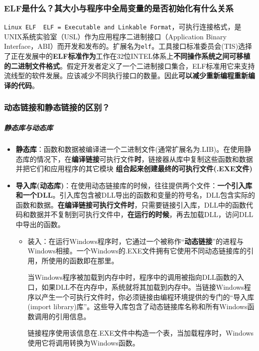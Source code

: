\documentclass[UTF8,a4paper,8pt]{ctexart}
\begin{document}
			
		\subsubsection{ELF是什么？其大小与程序中全局变量的是否初始化有什么关系}
			\verb|Linux ELF  ELF = Executable and Linkable Format|，可执行连接格式，是UNIX系统实验室（USL）作为应用程序二进制接口（Application Binary Interface，ABI）而开发和发布的。扩展名为\verb|elf|。工具接口标准委员会(TIS)选择了正在发展中的\textbf{ELF标准作为}工作在32位INTEL体系上\textbf{不同操作系统之间可移植的二进制文件格式}。假定开发者定义了一个二进制接口集合，ELF标准用它来支持流线型的软件发展。应该减少不同执行接口的数量。因此\textbf{可以减少重新编程重新编译的代码}。
			
		\subsubsection{动态链接和静态链接的区别？}
			\subparagraph{静态库与动态库}
			\begin{itemize}[itemindent = 1em]
				\item \textbf{静态库}：函数和数据被编译进一个二进制文件(通常扩展名为.LIB)。在使用静态库的情况下，在\textbf{编译链接}可执行文件\textbf{时}，链接器从库中复制这些函数和数据并把它们和应用程序的其它模块	\textbf{组合起来创建最终的可执行文件(.EXE文件)}
				
				\item \textbf{导入库(动态库)}：在使用动态链接库的时候，往往提供两个文件：\textbf{一个引入库和一个DLL}。引入库包含被DLL导出的函数和变量的符号名，DLL包含实际的函数和数据。\textbf{在编译链接可执行文件时}，只需要链接引入库，DLL中的函数代码和数据并不复制到可执行文件中，\textbf{在运行的时候}，再去加载DLL，访问DLL中导出的函数。
				
					\begin{itemize}
						\item 装入：在运行Windows程序时，它通过一个被称作“\textbf{动态链接}”的进程与Windows相接。一个Windows的.EXE文件拥有它使用不同动态链接库的引用，所使用的函数即在那里。
						
						当Windows程序被加载到内存中时，程序中的调用被指向DLL函数的入口，如果DLL不在内存中，系统就将其加载到内存中。当链接Windows程序以产生一个可执行文件时，你必须链接由编程环境提供的专门的“导入库(import library)库”。这些导入库包含了动态链接库名称和所有Windows函数调用的引用信息。
						
						链接程序使用该信息在.EXE文件中构造一个表，当加载程序时，Windows使用它将调用转换为Windows函数。
					\end{itemize}
			\end{itemize}
			
\end{document}
